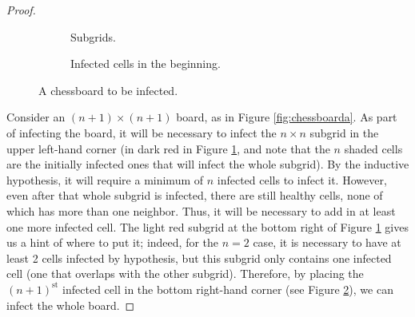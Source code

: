 \documentclass[../apprentice.tex]{subfiles}
\begin{document}
\begin{enumerate}
\begin{proof}
\begin{figure}[h!]
\begin{subfigure}[b]{0.3\linewidth}
                \caption{Subgrids.}
                \label{fig:chessboardb}
            \end{subfigure}
            \begin{subfigure}[b]{0.3\linewidth}
                \centering
                \caption{Infected cells in the beginning.}
                \label{fig:chessboardc}
            \end{subfigure}
            \caption{A chessboard to be infected.}
            \label{fig:chessboard}
        \end{figure}
        Consider an $(n+1)\times(n+1)$ board, as in Figure \ref{fig:chessboarda}. As part of infecting the board, it will be necessary to infect the $n\times n$ subgrid in the upper left-hand corner (in dark red in Figure \ref{fig:chessboardb}, and note that the $n$ shaded cells are the initially infected ones that will infect the whole subgrid). By the inductive hypothesis, it will require a minimum of $n$ infected cells to infect it. However, even after that whole subgrid is infected, there are still healthy cells, none of which has more than one neighbor. Thus, it will be necessary to add in at least one more infected cell. The light red subgrid at the bottom right of Figure \ref{fig:chessboardb} gives us a hint of where to put it; indeed, for the $n=2$ case, it is necessary to have at least 2 cells infected by hypothesis, but this subgrid only contains one infected cell (one that overlaps with the other subgrid). Therefore, by placing the $(n+1)^\text{st}$ infected cell in the bottom right-hand corner (see Figure \ref{fig:chessboardc}), we can infect the whole board.
    \end{proof}

\end{enumerate}
\end{document}
